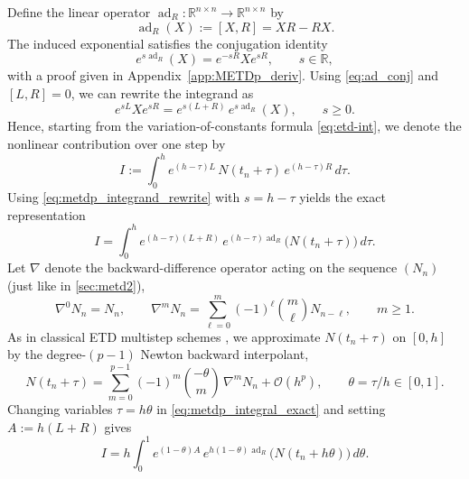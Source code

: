 \documentclass[12pt]{article}
\newcommand{\RR}{\mathds{R}}
\DeclareMathOperator{\ad}{ad}
\begin{document}
Define the linear operator $\ad_R:\RR^{n\times n}\to\RR^{n\times n}$ by
\begin{equation}
    \ad_R(X):=[X,R]=XR-RX.
\end{equation}
The induced exponential satisfies the conjugation identity
\begin{equation}
\label{eq:ad_conj}
    e^{s\ad_R}(X)=e^{-sR}Xe^{sR}, \qquad s\in\RR,
\end{equation}
with a proof given in Appendix~\ref{app:METDp_deriv}.
Using \eqref{eq:ad_conj} and $[L,R]=0$, we can rewrite the integrand as
\begin{equation}
\label{eq:metdp_integrand_rewrite}
    e^{sL}Xe^{sR} = e^{s(L+R)}\,e^{s\ad_R}(X), \qquad s\ge 0.
\end{equation}
Hence, starting from the variation-of-constants formula \eqref{eq:etd-int}, we denote the nonlinear contribution over one step by
\begin{equation}
\label{eq:metdp_I_def}
    I := \int_0^h e^{(h-\tau)L}\,N(t_n+\tau)\,e^{(h-\tau)R}\,d\tau .
\end{equation}
Using \eqref{eq:metdp_integrand_rewrite} with $s=h-\tau$ yields the exact representation
\begin{equation}
\label{eq:metdp_integral_exact}
    I = \int_0^h e^{(h-\tau)(L+R)}\,e^{(h-\tau)\ad_R}\bigl(N(t_n+\tau)\bigr)\,d\tau.
\end{equation}
Let $\nabla$ denote the backward-difference operator acting on the sequence $(N_n)$ (just like in \ref{sec:metd2}),
\begin{equation*}
\nabla^0N_n=N_n,\qquad 
\nabla^m N_n=\sum_{\ell=0}^{m}(-1)^\ell\binom{m}{\ell}N_{n-\ell},\qquad m\ge 1.
\end{equation*}
As in classical ETD multistep schemes \cite{cox-matthews:2002}, we approximate $N(t_n+\tau)$ on $[0,h]$ by the degree-$(p-1)$ Newton backward interpolant,
\begin{equation}
\label{eq:metdp_interp}
    N(t_n+\tau)=\sum_{m=0}^{p-1}(-1)^m\binom{-\theta}{m}\,\nabla^m N_n + \mathcal O(h^p),
    \qquad \theta=\tau/h\in[0,1].
\end{equation}
Changing variables $\tau=h\theta$ in \eqref{eq:metdp_integral_exact} and setting $A:=h(L+R)$ gives
\begin{equation}
\label{eq:metdp_theta_form}
    I = h\int_0^1 e^{(1-\theta)A}\,e^{h(1-\theta)\ad_R}\bigl(N(t_n+h\theta)\bigr)\,d\theta.
\end{equation}
\end{document}
